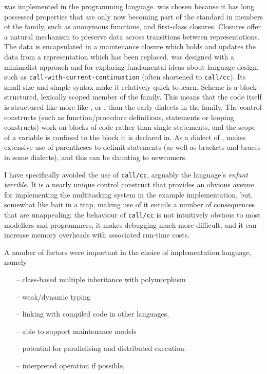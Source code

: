 \ReModel was implemented in the \Scheme programming language.
\Scheme was chosen because it has long possessed properties that are
only now becoming part of the standard in members of the \CC family,
such as anonymous functions, and first-class closures. Closures offer
a natural mechanism to preserve data across transitions between
representations. The data is encapsulated in a maintenance closure
which holds and updates the data from a representation which has been
replaced. \Scheme was designed with a minimalist approach and for
exploring fundamental ideas about language design, such
as \texttt{call-with-current-continuation} (often shortened
to \texttt{call/cc}).  Its small size and simple syntax make it
relatively quick to learn.  Scheme is a block-structured, lexically
scoped member of the  family. This means that the code
itself is structured like more like \CC, \Pascal or \Java, than the
early dialects in the \Lisp family.  The control constructs (such as
function/procedure definitions,  statements or looping
constructs) work on blocks of code rather than single statements, and
the scope of a variable is confined to the block it is declared in.
As a dialect of \Lisp, \Scheme makes extensive use of parentheses to
delimit statements (as well as brackets and braces in some dialects),
and this can be daunting to newcomers.

I have specifically avoided the use of \texttt{call/cc}, arguably the
language's \emph{enfant terrible}. It is a nearly unique control
construct that provides an obvious avenue for implementing the
multitasking system in the example implementation, but, somewhat like
bait in a trap, making use of it entails a number of consequences that
are unappealing: the behaviour of \texttt{call/cc} is not intuitively
obvious to most modellers and programmers, it makes debugging much
more difficult, and it can increase memory overheads with associated
run-time costs.

A number of factors were important in the choice of implementation
language, namely
\begin{itemize}
\item[--] class-based multiple inheritance with polymorphism\\
\item[--] weak/dynamic typing\\
\item[--] linking with compiled code in other languages,\\
\item[--] able to support maintenance models\\
\item[--] potential for parallelising and distributed execution.\\

\item[--] interpreted operation if possible,
\end{itemize}

